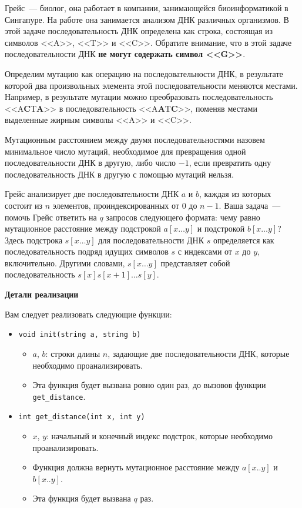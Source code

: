 Грейс~--- биолог, она работает в компании, занимающейся биоинформатикой в Сингапуре. На работе она занимается анализом ДНК различных организмов. В этой задаче последовательность ДНК определена как строка, состоящая из символов <<A>>, <<T>> и <<C>>. Обратите внимание, что в этой задаче последовательности ДНК \textbf{не могут содержать символ <<G>>}.

Определим мутацию как операцию на последовательности ДНК, в результате которой два произвольных элемента этой последовательности меняются местами. Например, в результате мутации можно преобразовать последовательность <<A\textbf{C}T\textbf{A}>> в последовательность <<A\textbf{A}T\textbf{C}>>, поменяв местами выделенные жирным символы <<A>> и <<C>>.

Мутационным расстоянием между двумя последовательностями назовем минимальное число мутаций, необходимое для превращения одной последовательности ДНК в другую, либо число $-1$, если превратить одну последовательность ДНК в другую с помощью мутаций нельзя.

Грейс анализирует две последовательности ДНК $a$ и $b$, каждая из которых состоит из $n$ элементов, проиндексированных от $0$ до $n - 1$.
Ваша задача~--- помочь Грейс ответить на $q$ запросов следующего формата: чему равно мутационное расстояние между подстрокой $a[x\ldots y]$ и подстрокой $b[x\ldots y]$?
Здесь подстрока $s[x\ldots y]$ для последовательности ДНК $s$ определяется как последовательность подряд идущих символов $s$ с индексами от $x$ до $y$, включительно.
Другими словами, $s[x\ldots y]$ представляет собой последовательность $s[x]s[x+1]\ldots s[y]$.

\textbf{Детали реализации}

Вам следует реализовать следующие функции:

\begin{itemize}
\item \texttt{void init(string a, string b)}
\begin{itemize}

\item $a$, $b$: строки длины $n$, задающие две последовательности ДНК, которые необходимо проанализировать.
\item Эта функция будет вызвана ровно один раз, до вызовов функции \texttt{get\_distance}.
\end{itemize}

\item \texttt{int get\_distance(int x, int y)}
\begin{itemize}
\item $x$, $y$: начальный и конечный индекс подстрок, которые необходимо проанализировать.
\item Функция должна вернуть мутационное расстояние между $a[x..y]$ и $b[x..y]$.
\item Эта функция будет вызвана $q$ раз.
\end{itemize}
\end{itemize}





